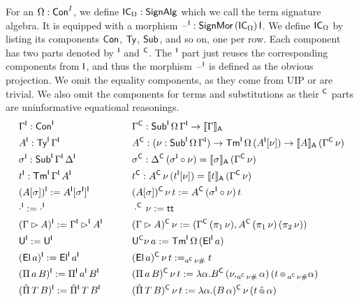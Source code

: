 \documentclass[a4paper,UKenglish,cleveref, autoref]{lipics-v2019}
\begin{document}
\begin{definition}
  For an $\Omega:\mathsf{Con}^I$, we define $\mathsf{IC}_\Omega:\mathsf{SignAlg}$ which we
  call the term signature algebra. It is equipped with a morphism
  $\mathord{\hspace{1pt}\text{--}\hspace{1pt}}^{\mathsf{I}} : \mathsf{SignMor}\,(\mathsf{IC}_\Omega)\,\mathsf{I}$. We define $\mathsf{IC}_{\Omega}$
  by listing its components $\mathsf{Con}$, $\mathsf{Ty}$, $\mathsf{Sub}$, and so on, one per
  row. Each component has two parts denoted by $^{\mathsf{I}}$ and $^{\mathsf{C}}$. The
  $^{\mathsf{I}}$ part just reuses the corresponding components from $\mathsf{I}$, and
  thus the morphism $\mathord{\hspace{1pt}\text{--}\hspace{1pt}}^{\mathsf{I}}$ is defined as the obvious
  projection. We omit the equality components, as they come from UIP
  or are trivial. We also omit the components for terms and
  substitutions as their $^{\mathsf{C}}$ parts are uninformative equational
  reasonings.
  \begin{alignat*}{10}
    & \Gamma^\I:\Con^\I && \hspace{1em} && \Gamma^\C: \Sub^\I\,\Omega\,\Gamma^\I\ra \ll\Gamma\rr_\A \\
    & A^\I:\Ty^\I\,\Gamma^\I && && A^\C:(\nu:\Sub^\I\,\Omega\,\Gamma^\I)\ra\Tm^\I\,\Omega\,(A^\I[\nu])\ra \ll A\rr_\A\,(\Gamma^\C\,\nu) \\
    & \sigma^\I:\Sub^\I\,\Gamma^\I\,\Delta^\I && && \sigma^\C:\Delta^\C\,(\sigma^\I\circ\nu)=\ll\sigma\rr_\A\,(\Gamma^\C\,\nu) \\
    & t^\I:\Tm^\I\,\Gamma^\I\,A^\I && && t^\C : A^\C\,\nu\,(t^\I[\nu])= \ll t\rr_\A\,(\Gamma^\C\,\nu) \\
    & (A[\sigma])^\I := A^\I[\sigma^\I]^\I && && (A[\sigma])^\C\,\nu\,t := A^\C\,(\sigma^\I\circ\nu)\,t \\
    & \cdot^\I := \cdot^\I && && \cdot^\C\,\nu := \tt \\
    & (\Gamma\rhd A)^\I := \Gamma^\I\rhd^\I A^\I && && (\Gamma\rhd A)^\C\,\nu := (\Gamma^\C\,(\pi_1\,\nu), A^\C\,(\pi_1\,\nu)\,(\pi_2\,\nu)) \\
    & \U^\I := \U^\I && && \U^\C\nu\,a := \Tm^\I\,\Omega\,(\El^\I\,a) \\
    & (\El\,a)^\I := \El^\I\,a^\I && && (\El\,a)^\C\,\nu\,t := _{a^\C\,\nu\#}t \\
    & (\Pi\,a\,B)^\I := \Pi^\I\,a^\I\,B^\I && && (\Pi\,a\,B)^\C\,\nu\,t := \lambda\alpha.B^\C\,(\nu, _{a^\C\,\nu\#}\alpha)\,(t\oldapp {_{a^\C\,\nu\#}\alpha}) \\
    & (\Pim\,T\,B)^\I := \Pim^\I\,T\,B^\I && && (\Pim\,T\,B)^\C\,\nu\,t := \lambda\alpha.(B\,\alpha)^\C\,\nu\,(t\appm\alpha)
  \end{alignat*}
\end{definition}
\end{document}
